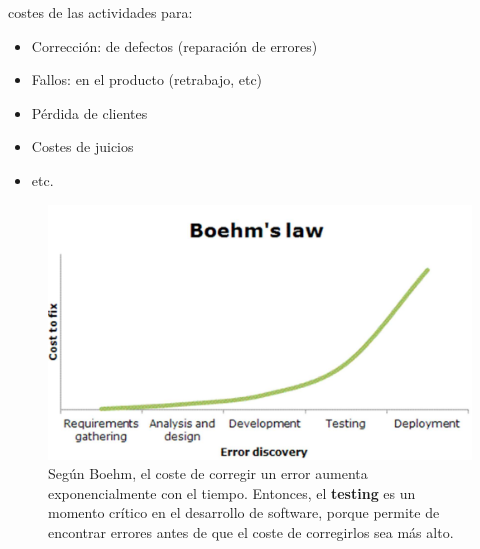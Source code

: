 \begin{definition}
   costes de las actividades para:
   \begin{itemize}
      \item Corrección: de defectos (reparación de errores)
      \item Fallos: en el producto (retrabajo, etc)
      \item Pérdida de clientes
      \item Costes de juicios
      \item etc.
   \end{itemize}
\end{definition}

\begin{figure}[htbp]
   \centering
   \includegraphics{images/01/boehm.png}
   \caption{Según Boehm, el coste de corregir un error aumenta exponencialmente con el tiempo. Entonces, el \textbf{testing} es un momento crítico en el desarrollo de software, porque permite de encontrar errores antes de que el coste de corregirlos sea más alto.}
   \label{fig:01/boehm}
\end{figure}